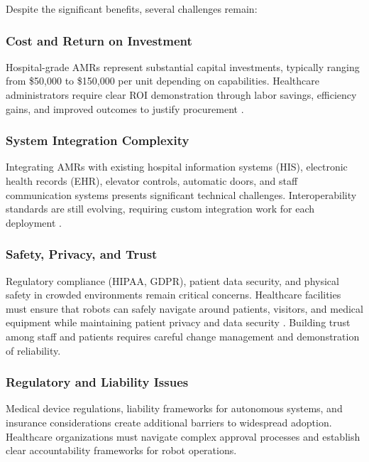 \documentclass[11pt,a4paper]{article}
\begin{document}
Despite the significant benefits, several challenges remain:

\subsubsection{Cost and Return on Investment}

Hospital-grade AMRs represent substantial capital investments, typically ranging from \$50,000 to \$150,000 per unit depending on capabilities. Healthcare administrators require clear ROI demonstration through labor savings, efficiency gains, and improved outcomes to justify procurement \cite{mdpi2024}.

\subsubsection{System Integration Complexity}

Integrating AMRs with existing hospital information systems (HIS), electronic health records (EHR), elevator controls, automatic doors, and staff communication systems presents significant technical challenges. Interoperability standards are still evolving, requiring custom integration work for each deployment \cite{frontiers2024}.

\subsubsection{Safety, Privacy, and Trust}

Regulatory compliance (HIPAA, GDPR), patient data security, and physical safety in crowded environments remain critical concerns. Healthcare facilities must ensure that robots can safely navigate around patients, visitors, and medical equipment while maintaining patient privacy and data security \cite{jmir2024}. Building trust among staff and patients requires careful change management and demonstration of reliability.

\subsubsection{Regulatory and Liability Issues}

Medical device regulations, liability frameworks for autonomous systems, and insurance considerations create additional barriers to widespread adoption. Healthcare organizations must navigate complex approval processes and establish clear accountability frameworks for robot operations.
\end{document}

